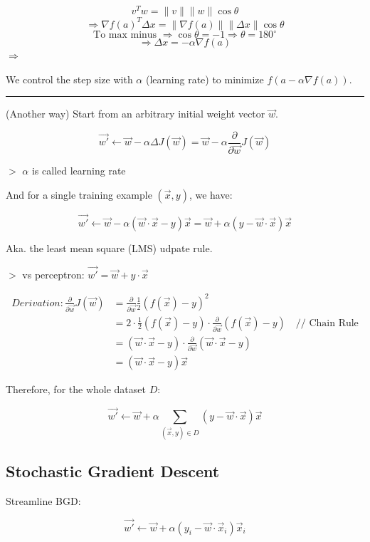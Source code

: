 \documentclass[12pt,a4paper]{article}
\newcommand{\remark}[1]{
    $>$ {\color{blue} #1}
}
\begin{document}
\[v^T w = \|v\| \|w\| \cos \theta\]
\[\Rightarrow \nabla f(a)^T \Delta x = \|\nabla f(a)\| \|\Delta x\| \cos \theta\]
\[\text{To max minus } \Rightarrow \cos \theta = -1 \Rightarrow \theta = 180^\circ\]
\[\Rightarrow \Delta x = - \alpha \nabla f(a)\]
$\Rightarrow$

We control the step size with $\alpha$ (learning rate) to minimize $f(a - \alpha \nabla f(a))$.

\rule{\linewidth}{0.4pt}

(Another way) Start from an arbitrary initial weight vector $\vec{w}$.

\[\vec{w'} \leftarrow \vec{w} - \alpha \Delta J(\vec{w}) = \vec{w} - \alpha \frac{\partial}{\partial \vec{w}}J(\vec{w})\]

\remark{$\alpha$ is called learning rate}

And for a single training example $(\vec{x}, y)$, we have:

\[\vec{w'} \leftarrow \vec{w} - \alpha(\vec{w} \cdot \vec{x} - y)\vec{x} = \vec{w} + \alpha(y - \vec{w} \cdot \vec{x})\vec{x}\]

Aka. the least mean square (LMS) udpate rule.

\remark{vs perceptron: $\vec{w'} = \vec{w} + y\cdot\vec{x}$}

\begin{align*}
Derivation:
\frac{\partial}{\partial \vec{w}}J(\vec{w}) &= \frac{\partial}{\partial \vec{w}}\frac{1}{2}(f(\vec{x}) -y)^2\\
&= 2 \cdot \frac{1}{2}(f(\vec{x}) - y) \cdot \frac{\partial}{\partial \vec{w}}(f(\vec{x}) - y) \quad \text{// Chain Rule}\\
&= (\vec{w} \cdot \vec{x} - y) \cdot \frac{\partial}{\partial \vec{w}}(\vec{w} \cdot \vec{x} - y)\\
&= (\vec{w} \cdot \vec{x} - y)\vec{x}
\end{align*}

Therefore, for the whole dataset $D$:

\[\vec{w'} \leftarrow \vec{w} + \alpha \sum_{(\vec{x},y) \in D}(y - \vec{w} \cdot \vec{x}) \vec{x}\]

\subsection*{Stochastic Gradient Descent}

Streamline BGD:

\[\vec{w'} \leftarrow \vec{w} + \alpha(y_i - \vec{w} \cdot \vec{x}_i)\vec{x}_i\]
\end{document}
